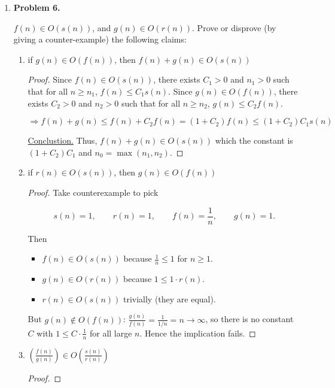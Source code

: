 \documentclass[11pt]{article}
\begin{document}
\begin{enumerate}
\item
\textbf{Problem 6.}

\(f(n) \in O(s(n))\), and \(g(n) \in O(r(n))\). Prove or disprove (by giving a counter-example) the following claims:

\begin{enumerate}
\item if \(g(n) \in O(f(n))\), then \(f(n) + g(n) \in O(s(n))\)

\begin{proof}

Since \(f(n) \in O(s(n))\), there exists \(C_1 > 0\) and \(n_1 > 0\) such that for all \(n \ge n_1\), \(f(n) \le C_1 s(n)\).
Since \(g(n) \in O(f(n))\), there exists \(C_2 > 0\) and \(n_2 > 0\) such that for all \(n \ge n_2\), \(g(n) \le C_2 f(n)\).

\[
\Rightarrow f(n) + g(n) \le f(n) + C_2 f(n) = (1 + C_2) f(n) \le (1 + C_2) C_1 s(n)
\]

\underline{Conclustion.} Thus, \(f(n) + g(n) \in O(s(n))\) which the constant is \((1 + C_2) C_1\) and \(n_0 = \max(n_1, n_2)\).

\end{proof}

\item if \(r(n) \in O(s(n))\), then \(g(n) \in O(f(n))\)

\begin{proof}

Take counterexample to pick

\[
s(n)=1,\qquad r(n)=1,\qquad f(n)=\frac{1}{n},\qquad g(n)=1.
\]

Then

\begin{itemize}
\item $f(n)\in O(s(n))$ because $\frac{1}{n}\le 1$ for $n\ge1$.
\item  $g(n)\in O(r(n))$ because $1\le 1\cdot r(n)$.
\item  $r(n)\in O(s(n))$ trivially (they are equal).
\end{itemize}

But $g(n)\notin O(f(n))$: $\frac{g(n)}{f(n)}=\frac{1}{1/n}=n\to\infty$, so there is no constant $C$ with $1\le C\cdot\frac{1}{n}$ for all large $n$. Hence the implication fails.

\end{proof}

\item \((\frac{f(n)}{g(n)}) \in O(\frac{s(n)}{r(n)})\)

\begin{proof}


\end{proof}
\end{enumerate}
\end{enumerate}
\end{document}
